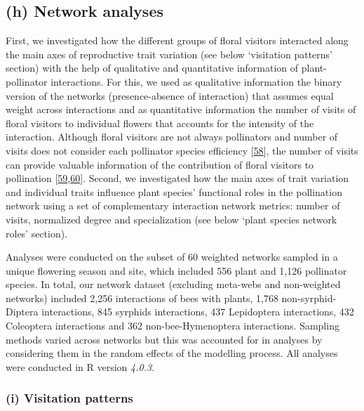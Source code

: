 \documentclass[
  12pt,
  a4paper,
]{article}
\begin{document}
\hypertarget{h-network-analyses}{%
\subsection{(h) Network analyses}\label{h-network-analyses}}

First, we investigated how the different groups of floral visitors interacted along the main axes of reproductive trait variation (see below `visitation patterns' section) with the help of qualitative and quantitative information of plant-pollinator interactions. For this, we used as qualitative information the binary version of the networks (presence-absence of interaction) that assumes equal weight across interactions and as quantitative information the number of visits of floral visitors to individual flowers that accounts for the intensity of the interaction. Although floral visitors are not always pollinators and number of visits does not consider each pollinator species efficiency {[}\protect\hyperlink{ref-ballantyne2015}{58}{]}, the number of visits can provide valuable information of the contribution of floral visitors to pollination {[}\protect\hyperlink{ref-vazquez2005}{59},\protect\hyperlink{ref-vazquez2012}{60}{]}. Second, we investigated how the main axes of trait variation and individual traits influence plant species' functional roles in the pollination network using a set of complementary interaction network metrics: number of visits, normalized degree and specialization (see below `plant species network roles' section).

Analyses were conducted on the subset of 60 weighted networks sampled in a unique flowering season and site, which included 556 plant and 1,126 pollinator species. In total, our network dataset (excluding meta-webs and non-weighted networks) included 2,256 interactions of bees with plants, 1,768 non-syrphid-Diptera interactions, 845 syrphids interactions, 437 Lepidoptera interactions, 432 Coleoptera interactions and 362 non-bee-Hymenoptera interactions. Sampling methods varied across networks but this was accounted for in analyses by considering them in the random effects of the modelling process. All analyses were conducted in R version \emph{4.0.3}.

\hypertarget{i-visitation-patterns}{%
\subsubsection{(i) Visitation patterns}\label{i-visitation-patterns}}
\end{document}
